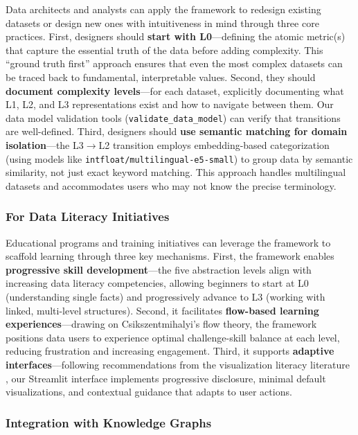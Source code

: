\documentclass[Afour,times,sageh]{sagej}
\begin{document}
Data architects and analysts can apply the framework to redesign existing datasets or design new ones with intuitiveness in mind through three core practices. First, designers should \textbf{start with L0}---defining the atomic metric(s) that capture the essential truth of the data before adding complexity. This ``ground truth first'' approach ensures that even the most complex datasets can be traced back to fundamental, interpretable values. Second, they should \textbf{document complexity levels}---for each dataset, explicitly documenting what L1, L2, and L3 representations exist and how to navigate between them. Our data model validation tools (\texttt{validate\_data\_model}) can verify that transitions are well-defined. Third, designers should \textbf{use semantic matching for domain isolation}---the L3$\to$L2 transition employs embedding-based categorization (using models like \texttt{intfloat/multilingual-e5-small}) to group data by semantic similarity, not just exact keyword matching. This approach handles multilingual datasets and accommodates users who may not know the precise terminology.

\subsubsection{For Data Literacy Initiatives}

Educational programs and training initiatives can leverage the framework to scaffold learning through three key mechanisms. First, the framework enables \textbf{progressive skill development}---the five abstraction levels align with increasing data literacy competencies, allowing beginners to start at L0 (understanding single facts) and progressively advance to L3 (working with linked, multi-level structures). Second, it facilitates \textbf{flow-based learning experiences}---drawing on Csikszentmihalyi's flow theory, the framework positions data users to experience optimal challenge-skill balance at each level, reducing frustration and increasing engagement. Third, it supports \textbf{adaptive interfaces}---following recommendations from the visualization literacy literature \citep{alhamadi2022dataqualitymismatched, amyrotos2021adaptivevisualizationsfor}, our Streamlit interface implements progressive disclosure, minimal default visualizations, and contextual guidance that adapts to user actions.

\subsubsection{Integration with Knowledge Graphs}
\end{document}
